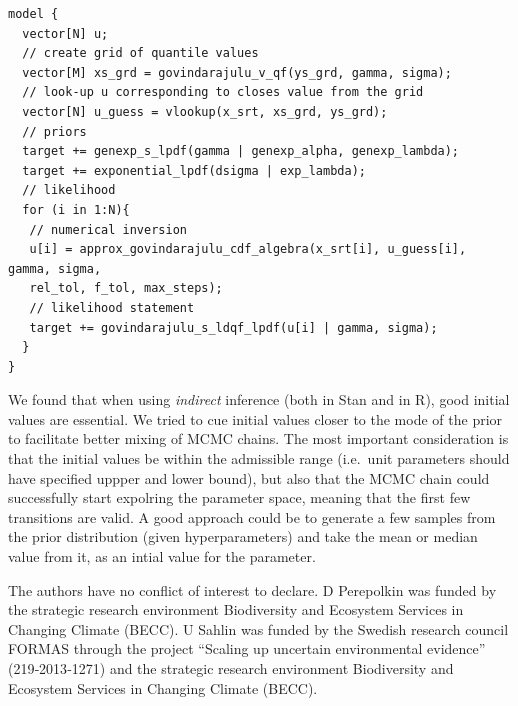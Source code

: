 \documentclass[ba]{imsart}
\numberwithin{equation}{section}
\theoremstyle{plain}
\begin{document}
\begin{verbatim}
model {
  vector[N] u;
  // create grid of quantile values
  vector[M] xs_grd = govindarajulu_v_qf(ys_grd, gamma, sigma);
  // look-up u corresponding to closes value from the grid
  vector[N] u_guess = vlookup(x_srt, xs_grd, ys_grd);
  // priors
  target += genexp_s_lpdf(gamma | genexp_alpha, genexp_lambda);
  target += exponential_lpdf(dsigma | exp_lambda);
  // likelihood
  for (i in 1:N){
   // numerical inversion
   u[i] = approx_govindarajulu_cdf_algebra(x_srt[i], u_guess[i], gamma, sigma, 
   rel_tol, f_tol, max_steps);
   // likelihood statement
   target += govindarajulu_s_ldqf_lpdf(u[i] | gamma, sigma);
  }
}
\end{verbatim}

We found that when using \emph{indirect} inference (both in Stan and in R), good initial values are essential. We tried to cue initial values closer to the mode of the prior to facilitate better mixing of MCMC chains. The most important consideration is that the initial values be within the admissible range (i.e.~unit parameters should have specified uppper and lower bound), but also that the MCMC chain could successfully start expolring the parameter space, meaning that the first few transitions are valid. A good approach could be to generate a few samples from the prior distribution (given hyperparameters) and take the mean or median value from it, as an intial value for the parameter.


\begin{supplement}
\end{supplement}
\begin{supplement}
\end{supplement}

\begin{acks}[Acknowledgments]
The authors have no conﬂict of interest to declare. D Perepolkin was funded by the strategic research environment Biodiversity and Ecosystem Services in Changing Climate (BECC). U Sahlin was funded by the Swedish research council FORMAS through the project ``Scaling up uncertain environmental evidence'' (219‐2013‐1271) and the strategic research environment Biodiversity and Ecosystem Services in Changing Climate (BECC).
\end{acks}



\end{document}
